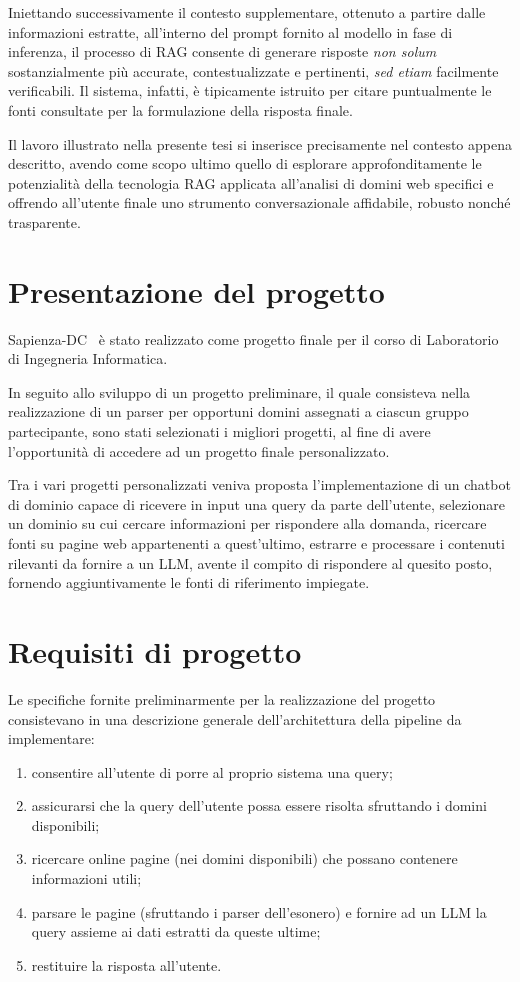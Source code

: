 Iniettando successivamente il contesto supplementare, ottenuto a partire dalle informazioni estratte, all'interno del prompt fornito al modello in fase di inferenza, il processo di RAG consente di generare risposte \textit{non solum} sostanzialmente più accurate, contestualizzate e pertinenti, \textit{sed etiam} facilmente verificabili. Il sistema, infatti, è tipicamente istruito per citare puntualmente le fonti consultate per la formulazione della risposta finale. 

Il lavoro illustrato nella presente tesi si inserisce precisamente nel contesto appena descritto, avendo come scopo ultimo quello di esplorare approfonditamente le potenzialità della tecnologia RAG applicata all'analisi di domini web specifici e offrendo all'utente finale uno strumento conversazionale affidabile, robusto nonché trasparente.

\section{Presentazione del progetto}
Sapienza-DC~\cite{sapienzaDC_repo} è stato realizzato come progetto finale per il corso di Laboratorio di Ingegneria Informatica.

In seguito allo sviluppo di un progetto preliminare, il quale consisteva nella realizzazione di un parser per opportuni domini assegnati a ciascun gruppo partecipante, sono stati selezionati i migliori progetti, al fine di avere l'opportunità di accedere ad un progetto finale personalizzato.

Tra i vari progetti personalizzati veniva proposta l'implementazione di un chatbot di dominio capace di ricevere in input una query da parte dell'utente, selezionare un dominio su cui cercare informazioni per rispondere alla domanda, ricercare fonti su pagine web appartenenti a quest'ultimo, estrarre e processare i contenuti rilevanti da fornire a un LLM, avente il compito di rispondere al quesito posto, fornendo aggiuntivamente le fonti di riferimento impiegate.

\section{Requisiti di progetto}
Le specifiche fornite preliminarmente per la realizzazione del progetto consistevano in una descrizione generale dell'architettura della pipeline da implementare:

\begin{enumerate}[label=(\roman*)]
    \item consentire all'utente di porre al proprio sistema una query;
    \item assicurarsi che la query dell'utente possa essere risolta sfruttando i domini disponibili;
    \item ricercare online pagine (nei domini disponibili) che possano contenere informazioni utili;
    \item parsare le pagine (sfruttando i parser dell'esonero) e fornire ad un LLM la query assieme ai dati estratti da queste ultime;
    \item restituire la risposta all'utente.
\end{enumerate}

